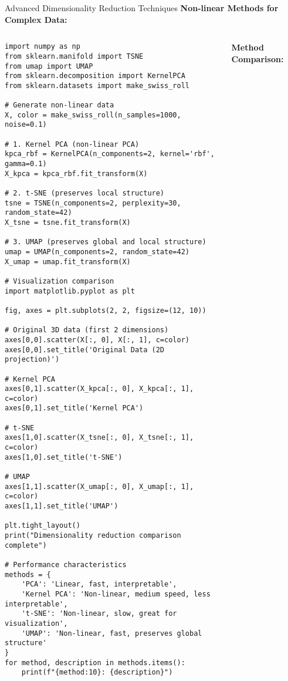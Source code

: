 \documentclass[aspectratio=169,11pt]{beamer}
\begin{document}
\begin{frame}[fragile]{Advanced Dimensionality Reduction Techniques}
\textbf{Non-linear Methods for Complex Data:}

\begin{columns}
\begin{column}{0.55\textwidth}
\begin{lstlisting}
import numpy as np
from sklearn.manifold import TSNE
from umap import UMAP
from sklearn.decomposition import KernelPCA
from sklearn.datasets import make_swiss_roll

# Generate non-linear data
X, color = make_swiss_roll(n_samples=1000, noise=0.1)

# 1. Kernel PCA (non-linear PCA)
kpca_rbf = KernelPCA(n_components=2, kernel='rbf', gamma=0.1)
X_kpca = kpca_rbf.fit_transform(X)

# 2. t-SNE (preserves local structure)
tsne = TSNE(n_components=2, perplexity=30, random_state=42)
X_tsne = tsne.fit_transform(X)

# 3. UMAP (preserves global and local structure)
umap = UMAP(n_components=2, random_state=42)
X_umap = umap.fit_transform(X)

# Visualization comparison
import matplotlib.pyplot as plt

fig, axes = plt.subplots(2, 2, figsize=(12, 10))

# Original 3D data (first 2 dimensions)
axes[0,0].scatter(X[:, 0], X[:, 1], c=color)
axes[0,0].set_title('Original Data (2D projection)')

# Kernel PCA
axes[0,1].scatter(X_kpca[:, 0], X_kpca[:, 1], c=color)
axes[0,1].set_title('Kernel PCA')

# t-SNE
axes[1,0].scatter(X_tsne[:, 0], X_tsne[:, 1], c=color)
axes[1,0].set_title('t-SNE')

# UMAP
axes[1,1].scatter(X_umap[:, 0], X_umap[:, 1], c=color)
axes[1,1].set_title('UMAP')

plt.tight_layout()
print("Dimensionality reduction comparison complete")

# Performance characteristics
methods = {
    'PCA': 'Linear, fast, interpretable',
    'Kernel PCA': 'Non-linear, medium speed, less interpretable',
    't-SNE': 'Non-linear, slow, great for visualization',
    'UMAP': 'Non-linear, fast, preserves global structure'
}
for method, description in methods.items():
    print(f"{method:10}: {description}")
\end{lstlisting}
\end{column}
\begin{column}{0.45\textwidth}
\textbf{Method Comparison:}


\end{column}
\end{columns}
\end{frame}
\end{document}
